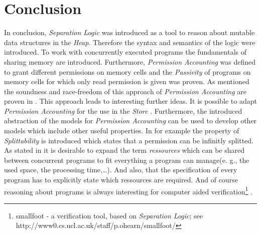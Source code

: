 \section{Conclusion}
	In conclusion, \emph{Separation Logic} was introduced as a tool to reason
	about mutable data structures in the \emph{Heap}. Therefore the syntax and
	semantics of the logic were introduced. To work with concurrently executed
	programs the fundamentals of sharing memory are introduced. Furthermore,
	\emph{Permission Accounting} was defined to grant different permissions on
	memory cells and the \emph{Passivity} of programs on memory cells for which
	only read permission is given was proven. As mentioned the soundness and
	race-freedom of this approach of \emph{Permission Accounting} are proven in
	\cite{seplogproof}. This approach leads to interesting further ideas.
	It is possible to adapt \emph{Permission Accounting} for the use in the
	\emph{Store} \cite{storeperm}. Furthermore, the introduced abstraction of
	the models for \emph{Permission Accounting} can be used to develop other
	models which include other useful properties. In \cite{freshlook} for example
	the property of \emph{Splittability} is introduced which states that a
	permission can be infinitly splitted. As stated in \cite{PermAcc}
	it is desirable to expand the term \emph{ressources} which can be shared
	between concurrent programs to fit everything a program can manage(e. g.,
	the used space, the processing time,\dots). And also, that the specification
	of every program has to explicitly state which ressources are required. And
	of course reasoning about programs is always interesting for computer aided
	verification\footnote{smallfoot - a verification tool, based on
	\emph{Separation Logic}; see http://www0.cs.ucl.ac.uk/staff/p.ohearn/smallfoot/}
	\cite{freshlook}.
